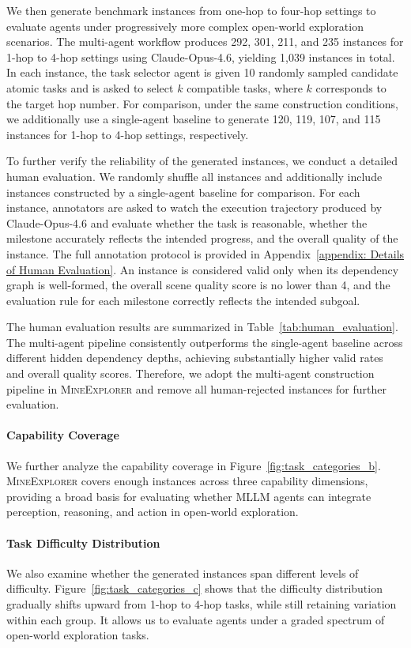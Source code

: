 \documentclass[11pt]{article}
\begin{document}
We then generate benchmark instances from one-hop to four-hop settings to evaluate agents under progressively more complex open-world exploration scenarios. 
The multi-agent workflow produces 292, 301, 211, and 235 instances for 1-hop to 4-hop settings using Claude-Opus-4.6, yielding 1,039 instances in total. 
In each instance, the task selector agent is given 10 randomly sampled candidate atomic tasks and is asked to select $k$ compatible tasks, where $k$ corresponds to the target hop number. 
For comparison, under the same construction conditions, we additionally use a single-agent baseline to generate 120, 119, 107, and 115 instances for 1-hop to 4-hop settings, respectively.

To further verify the reliability of the generated instances, we conduct a detailed human evaluation. 
We randomly shuffle all instances and additionally include instances constructed by a single-agent baseline for comparison. 
For each instance, annotators are asked to watch the execution trajectory produced by Claude-Opus-4.6 and evaluate whether the task is reasonable, whether the milestone accurately reflects the intended progress, and the overall quality of the instance. 
The full annotation protocol is provided in Appendix~\ref{appendix: Details of Human Evaluation}. 
An instance is considered valid only when its dependency graph is well-formed, the overall scene quality score is no lower than 4, and the evaluation rule for each milestone correctly reflects the intended subgoal.

The human evaluation results are summarized in Table~\ref{tab:human_evaluation}. 
The multi-agent pipeline consistently outperforms the single-agent baseline across different hidden dependency depths, achieving substantially higher valid rates and overall quality scores. 
Therefore, we adopt the multi-agent construction pipeline in \textsc{MineExplorer} and remove all human-rejected instances for further evaluation.

\paragraph{Capability Coverage} 
We further analyze the capability coverage in Figure~\ref{fig:task_categories_b}. 
\textsc{MineExplorer} covers enough instances across three capability dimensions, providing a broad basis for evaluating whether MLLM agents can integrate perception, reasoning, and action in open-world exploration.

\paragraph{Task Difficulty Distribution} 
We also examine whether the generated instances span different levels of difficulty. 
Figure~\ref{fig:task_categories_c} shows that the difficulty distribution gradually shifts upward from 1-hop to 4-hop tasks, while still retaining variation within each group. 
It allows us to evaluate agents under a graded spectrum of open-world exploration tasks.
\end{document}
